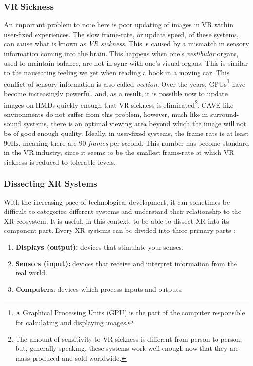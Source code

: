 \subsubsection{VR Sickness}

An important problem to note here is poor updating of images in VR within user-fixed experiences. The slow frame-rate, or update speed, of these systems, can cause what is known as \textit{VR sickness}. This is caused by a mismatch in sensory information coming into the brain. This happens when one's \textit{vestibular} organs, used to maintain balance, are not in sync with one's visual organs. This is similar to the nauseating feeling we get when reading a book in a moving car. This conflict of sensory information is also called \textit{vection}. Over the years, GPUs\footnote{A Graphical Processing Units (GPU) is the part of the computer responsible for calculating and displaying images.} have become increasingly powerful, and, as a result, it is possible now to update images on HMDs quickly enough that VR sickness is eliminated\footnote{The amount of sensitivity to VR sickness is different from person to person, but, generally speaking, these systems work well enough now that they are mass produced and sold worldwide.}. CAVE-like environments do not suffer from this problem, however, much like in surround-sound systems, there is an optimal viewing area beyond which the image will not be of good enough quality. Ideally, in user-fixed systems, the frame rate is at least 90Hz, meaning there are 90 \textit{frames} per second. This number has become standard in the VR industry, since it seems to be the smallest frame-rate at which VR sickness is reduced to tolerable levels. 


\subsubsection{Dissecting XR Systems}

With the increasing pace of technological development, it can sometimes be difficult to categorize different systems and understand their relationship to the XR ecosystem. It is useful, in this context, to be able to dissect XR into its component part. Every XR systems can be divided into three primary parts \cite{lavalle2016virtual}:

\begin{enumerate}
    \item \textbf{Displays (output):} devices that stimulate your senses. %
    \item \textbf{Sensors (input):} devices that receive and interpret information from the real world. %
    \item \textbf{Computers:} devices which process inputs and outputs.
\end{enumerate}

